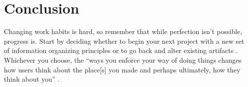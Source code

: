 \documentclass[10pt,letterpaper]{article}
\begin{document}
\section*{Conclusion}

Changing work habits is hard, so remember that while perfection isn't possible,
progress is. Start by deciding whether to begin your next project with a new set
of information organizing principles or to go back and alter existing artifacts
\cite{Briney2015}. Whichever you choose, the ``ways you enforce your way of
doing things changes how users think about the place[s] you made and perhaps
ultimately, how they think about you'' \cite{Covert2014}.


\end{document}
